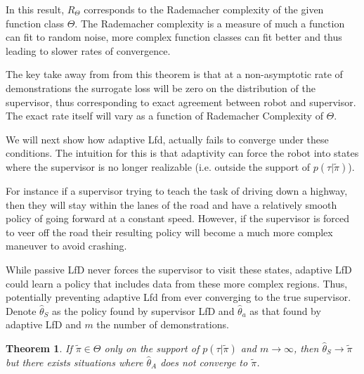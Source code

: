\documentclass[10pt, conference]{ieeeconf}      %
\newtheorem{theorem}{Theorem}[section]
\begin{document}
In this result, $R_{\Theta}$ corresponds to the Rademacher complexity of the given function class $\Theta$. The Rademacher complexity is a measure of much a function can fit to random noise, more complex function classes can fit better and thus leading to slower rates of convergence. 

The key take away from from this theorem  is that at a non-asymptotic rate of demonstrations the surrogate loss will be zero on the distribution of the supervisor, thus corresponding to exact agreement between robot and supervisor. The exact rate itself will vary as a function of Rademacher Complexity of $\Theta$. 


We will next show how adaptive Lfd, actually fails to converge under these conditions. The intuition for this is that adaptivity can force the robot into states where the supervisor is no longer realizable (i.e. outside the support of $p(\tau|\tilde{\pi})$). 

For instance if a supervisor trying to teach the task of driving down a highway, then they will stay within the lanes of the road and have a relatively smooth policy of going forward at a constant speed. However, if the supervisor is forced to veer off the road their resulting policy will become a much more complex maneuver to avoid crashing. 

While passive LfD never forces the supervisor to visit these states, adaptive LfD  could learn a  policy that includes data from these more complex regions. Thus, potentially preventing adaptive Lfd from ever converging to the true supervisor. Denote $\hat{\theta}_S$ as the policy found by supervisor LfD and $\hat{\theta}_a$ as that found by adaptive LfD and $m$ the number of demonstrations. \\

\begin{theorem}\label{thm:n_c}
If $\tilde{\pi} \in \Theta$ only on the support of $p(\tau|\tilde{\pi})$ and $m\rightarrow \infty$, then $\hat{\theta}_S \rightarrow \tilde{\pi}$ but there exists situations where $\hat{\theta}_A$ does not converge to $\tilde{\pi}$.\\
\end{theorem}
\end{document}
